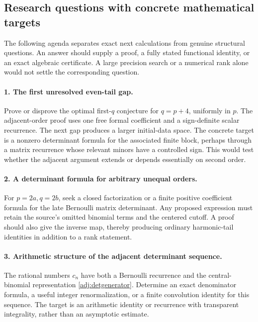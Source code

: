 \subsection{Research questions with concrete mathematical targets}

The following agenda separates exact next calculations from genuine
structural questions.  An answer should supply a proof, a fully stated
functional identity, or an exact algebraic certificate.  A large
precision search or a numerical rank alone would not settle the
corresponding question.

\paragraph{1. The first unresolved even-tail gap.}
Prove or disprove the optimal first-$q$ conjecture for
$q=p+4$, uniformly in $p$.  The adjacent-order proof uses one free
formal coefficient and a sign-definite scalar recurrence.  The next
gap produces a larger initial-data space.  The concrete target is a
nonzero determinant formula for the associated finite block, perhaps
through a matrix recurrence whose relevant minors have a controlled
sign.  This would test whether the adjacent argument extends or
depends essentially on second order.

\paragraph{2. A determinant formula for arbitrary unequal orders.}
For $p=2a,q=2b$, seek a closed factorization or a finite positive
coefficient formula for the late Bernoulli matrix determinant.
Any proposed expression must retain the source's omitted binomial
terms and the centered cutoff.  A proof should also give the inverse
map, thereby producing ordinary harmonic-tail identities in addition
to a rank statement.

\paragraph{3. Arithmetic structure of the adjacent determinant sequence.}
The rational numbers $c_n$ have both a Bernoulli recurrence and the
central-binomial representation \eqref{adj:detgenerator}.
Determine an exact denominator formula, a useful integer
renormalization, or a finite convolution identity for this sequence.
The target is an arithmetic identity or recurrence with transparent
integrality, rather than an asymptotic estimate.

